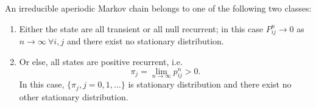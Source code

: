 \begin{theorem}
    An irreducible aperiodic Markov chain belongs to one of the following two classes:
    \begin{enumerate}
        \item Either the state are all transient or all null recurrent; in this case $ P^{n}_{ij}\to 0 $ as $ n\to \infty \ \forall i,j $
            and there exist no stationary distribution.
        \item Or else, all states are positive recurrent, i.e.
            \[
                \pi_{j} = \lim_{n\to \infty}p_{ij}^{n}>0.
            \]
            In this case, $ \{\pi_{j},j=0,1,\ldots\} $ is stationary distribution and there exist no other stationary distribution.
    \end{enumerate}
\end{theorem}
